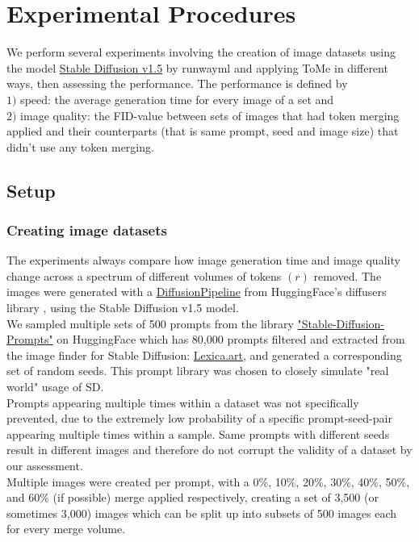 \section{Experimental Procedures} \label{experiments}
We perform several experiments involving the creation of image datasets using the model \href{https://huggingface.co/runwayml/stable-diffusion-v1-5}{Stable Diffusion v1.5} by runwayml \cite{Rombach_2022_CVPR} and applying ToMe in different ways, then assessing the performance.
The performance is defined by\\ 
\(1)\) speed: the average generation time for every image of a set and\\
\(2)\) image quality: the FID-value between sets of images that had token merging applied and their counterparts (that is same prompt, seed and image size) that didn't use any token merging.



\subsection{Setup}
\subsubsection*{Creating image datasets}
The experiments always compare how image generation time and image quality change across a spectrum of different volumes of tokens \((r)\) removed.
The images were generated with a \href{https://huggingface.co/docs/diffusers/v0.18.2/en/api/diffusion_pipeline}{DiffusionPipeline} from HuggingFace's diffusers library \cite{von-platen-etal-2022-diffusers}, using the Stable Diffusion v1.5 model.\\
We sampled multiple sets of 500 prompts from the library \href{https://huggingface.co/datasets/Gustavosta/Stable-Diffusion-Prompts}{"Stable-Diffusion-Prompts"} on HuggingFace which has 80,000 prompts filtered and extracted from the image finder for Stable Diffusion: \href{https://lexica.art}{Lexica.art}, and generated a corresponding set of random seeds. This prompt library was chosen to closely simulate "real world" usage of SD.\\
Prompts appearing multiple times within a dataset was not specifically prevented, due to the extremely low probability of a specific prompt-seed-pair appearing multiple times within a sample. Same prompts with different seeds result in different images and therefore do not corrupt the validity of a dataset by our assessment.\\
Multiple images were created per prompt, with a 0\%, 10\%, 20\%, 30\%, 40\%, 50\%, and 60\% (if possible) merge applied respectively, creating a set of 3,500 (or sometimes 3,000) images which can be split up into subsets of 500 images each for every merge volume.



